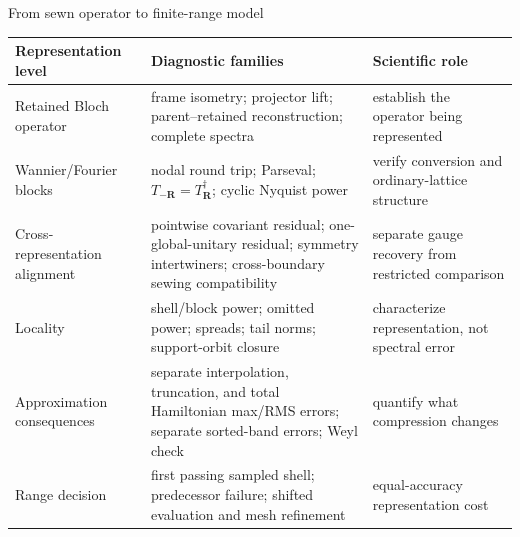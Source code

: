 \documentclass[aspectratio=169,10pt]{beamer}
\begin{document}
\begin{frame}{From sewn operator to finite-range model}
  \small
  \begin{tabular}{p{}p{}p{}}
    \toprule
    Representation level & Diagnostic families & Scientific role\\
    \midrule
    Retained Bloch operator
      & frame isometry; projector lift; parent--retained reconstruction; complete spectra
      & establish the operator being represented\\[0.45em]
    Wannier/Fourier blocks
      & nodal round trip; Parseval; $T_{-\mathbf R}=T_{\mathbf R}^\dagger$;
        cyclic Nyquist power
      & verify conversion and ordinary-lattice structure\\[0.45em]
    Cross-representation alignment
      & pointwise covariant residual; one-global-unitary residual; symmetry intertwiners;
        cross-boundary sewing compatibility
      & separate gauge recovery from restricted comparison\\[0.45em]
    Locality
      & shell/block power; omitted power; spreads; tail norms; support-orbit closure
      & characterize representation, not spectral error\\[0.45em]
    Approximation consequences
      & separate interpolation, truncation, and total Hamiltonian max/RMS errors;
        separate sorted-band errors; Weyl check
      & quantify what compression changes\\[0.45em]
    Range decision
      & first passing sampled shell; predecessor failure; shifted evaluation and mesh
        refinement
      & equal-accuracy representation cost\\
    \bottomrule
  \end{tabular}
\end{frame}
\end{document}
